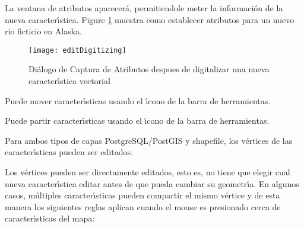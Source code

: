 La ventana de atributos aparecer\'a, permitiendole meter la informaci\'on de la nueva caracter\'{\i}stica.
Figure \ref{fig:vector_digitising} muestra como establecer atributos para un nuevo rio ficticio
en Alaska.

\begin{figure}[ht]
   \begin{center}
   \caption{Di\'alogo de Captura de Atributos despues de digitalizar una nueva caracter\'{\i}stica vectorial
   \nixcaption}\label{fig:vector_digitising}\smallskip
   \texttt{[image: editDigitizing]}
\end{center}  
\end{figure}

\begin{Tip}[ht]\caption{\textsc{Tipos de Valores de Atributos}}
\end{Tip}


Puede mover caracter\'{\i}sticas usando el \'{\i}cono  
de la barra de herramientas.


Puede partir caracter\'{\i}sticas usando el \'{\i}cono 
de la barra de herramientas.


Para ambos tipos de capas PostgreSQL/PostGIS y  shapefile, los v\'ertices de las caracter\'{\i}sticas pueden ser editados. 

Los v\'ertices pueden ser directamente editados, esto es, no tiene
que elegir cual nueva caracter\'{\i}stica editar antes de que pueda cambiar
su geometr\'{\i}a.
En algunos casos, m\'ultiples caracter\'{\i}sticas pueden compartir el mismo v\'ertice
y de esta manera los siguientes reglas aplican cuando el mouse es presionado
cerca de caracter\'{\i}sticas del mapa:

